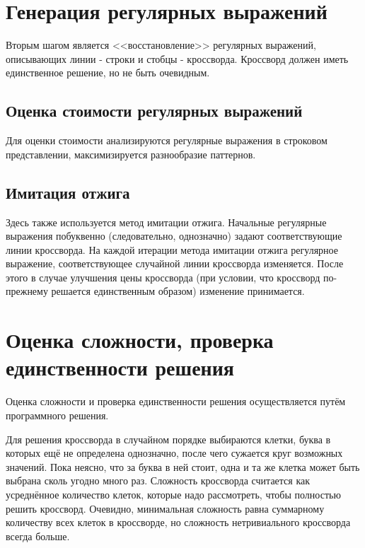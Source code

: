 \documentclass[12pt]{report}
\begin{document}
\section{Генерация регулярных выражений} 
Вторым шагом является <<восстановление>> регулярных выражений, описывающих линии - строки и стобцы - кроссворда. Кроссворд должен иметь единственное решение, но не быть очевидным.

\subsection{Оценка стоимости регулярных выражений}
Для оценки стоимости анализируются регулярные выражения в строковом представлении, максимизируется разнообразие паттернов. %

\subsection{Имитация отжига}
Здесь  также используется метод имитации отжига. Начальные регулярные выражения побуквенно (следовательно, однозначно) задают соответствующие линии кроссворда. На каждой итерации метода имитации отжига регулярное выражение, соответствующее случайной линии кроссворда изменяется. После этого в случае улучшения цены кроссворда (при условии, что кроссворд по-прежнему решается единственным образом) изменение принимается.


\section{Оценка сложности, проверка единственности решения} 
Оценка сложности и проверка единственности решения осуществляется путём программного решения.

Для решения кроссворда в случайном порядке выбираются клетки, буква в которых ещё не определена однозначно, после чего сужается круг возможных значений. Пока неясно, что за буква в ней стоит, одна и та же клетка может быть выбрана сколь угодно много раз. Сложность кроссворда считается как усреднённое количество клеток, которые надо рассмотреть, чтобы полностью решить кроссворд. Очевидно, минимальная сложность равна суммарному количеству всех клеток в кроссворде, но сложность нетривиального кроссворда всегда больше.
   

    \newpage %
    
\end{document}
